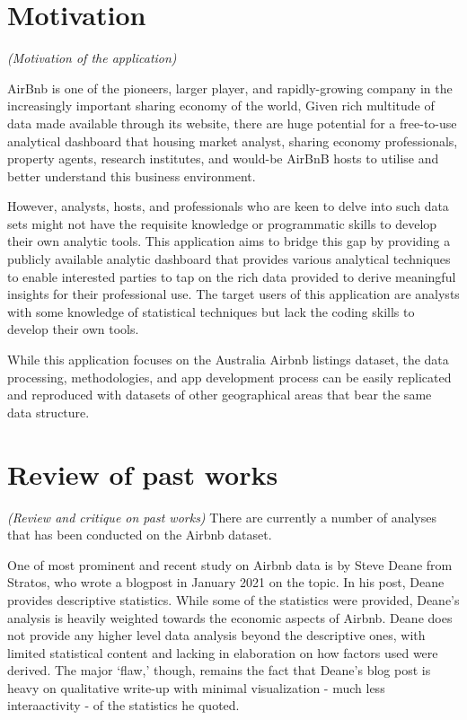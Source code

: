 \documentclass{acm_proc_article-sp}
\begin{document}
\hypertarget{motivation}{%
\section{Motivation}\label{motivation}}

\emph{(Motivation of the application)}

AirBnb is one of the pioneers, larger player, and rapidly-growing
company in the increasingly important sharing economy of the world,
Given rich multitude of data made available through its website, there
are huge potential for a free-to-use analytical dashboard that housing
market analyst, sharing economy professionals, property agents, research
institutes, and would-be AirBnB hosts to utilise and better understand
this business environment.

However, analysts, hosts, and professionals who are keen to delve into
such data sets might not have the requisite knowledge or programmatic
skills to develop their own analytic tools. This application aims to
bridge this gap by providing a publicly available analytic dashboard
that provides various analytical techniques to enable interested parties
to tap on the rich data provided to derive meaningful insights for their
professional use. The target users of this application are analysts with
some knowledge of statistical techniques but lack the coding skills to
develop their own tools.

While this application focuses on the Australia Airbnb listings dataset,
the data processing, methodologies, and app development process can be
easily replicated and reproduced with datasets of other geographical
areas that bear the same data structure.

\hypertarget{review-of-past-works}{%
\section{Review of past works}\label{review-of-past-works}}

\emph{(Review and critique on past works)} There are currently a number
of analyses that has been conducted on the Airbnb dataset.

One of most prominent and recent study on Airbnb data is by Steve Deane
from Stratos, who wrote a blogpost in January 2021 on the topic. In his
post, Deane provides descriptive statistics. While some of the
statistics were provided, Deane's analysis is heavily weighted towards
the economic aspects of Airbnb. Deane does not provide any higher level
data analysis beyond the descriptive ones, with limited statistical
content and lacking in elaboration on how factors used were derived. The
major `flaw,' though, remains the fact that Deane's blog post is heavy
on qualitative write-up with minimal visualization - much less
interaactivity - of the statistics he quoted.
\end{document}
